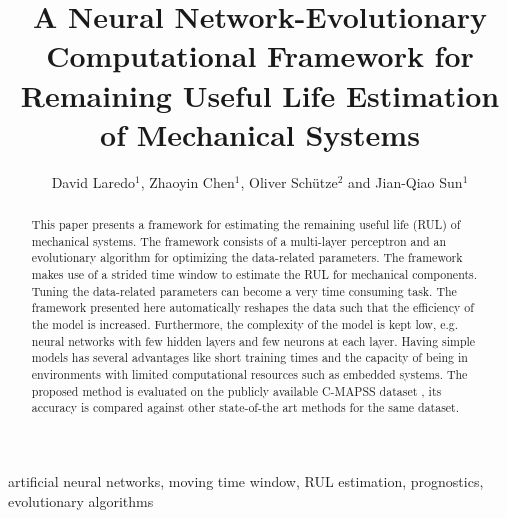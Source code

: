 


\begin{frontmatter}

\title{A Neural Network-Evolutionary Computational Framework for Remaining Useful Life Estimation of Mechanical Systems}

\author{David Laredo$^{1}$, Zhaoyin Chen$^{1}$, Oliver Sch\"utze$^{2}$ and Jian-Qiao Sun$^{1}$}
\address{
$^{1}$Department of Mechanical Engineering\\
School of Engineering, University of California\\
Merced, CA 95343, USA\\
$^{2}$Department of Computer Science, CINVESTAV\\ 
Mexico City, Mexico\\
Corresponding author. Email: davidlaredo1@gmail.com}

\begin{abstract}
This paper presents a framework for estimating the remaining useful life (RUL) of mechanical systems. The framework consists of a multi-layer perceptron and an evolutionary algorithm for optimizing the data-related parameters. The framework makes use of a strided time window to estimate the RUL for mechanical components. Tuning the data-related parameters can become a very time consuming task. The framework presented here automatically reshapes the data such that the efficiency of the model is increased. Furthermore, the complexity of the model is kept low, e.g. neural networks with few hidden layers and few neurons at each layer. Having simple models has several advantages like short training times and the capacity of being in environments with limited computational resources such as embedded systems. The proposed method is evaluated on the publicly available C-MAPSS dataset \cite{Saxena2008a}, its accuracy is compared against other state-of-the art methods for the same dataset. 


\end{abstract}


\begin{keyword}
artificial neural networks\sep
moving time window\sep
RUL estimation\sep
prognostics\sep
evolutionary algorithms
\end{keyword}

\end{frontmatter}
